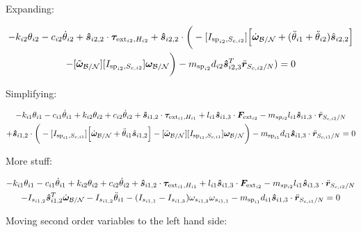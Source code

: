 \documentclass[paper]{aiaaNew}
\begin{document}
Expanding:

\begin{multline}
-k_{i2} \theta_{i2} - c_{i2} \dot{\theta}_{i2} + \bm{\hat{s}}_{i2,2} \cdot \bm \tau_{\text{ext}_{i2},H_{i2}} + \bm{\hat{s}}_{i2,2} \cdot \bigg(-[I_{\text{sp}_{i2},S_{c,i2}}] \Big[\dot{\bm \omega}_{\cal{B/N}} + (\ddot{\theta}_{i1}  + \ddot{\theta}_{i2})\hat{\bm s}_{i2,2}\Big]  \\
-[\tilde{\bm \omega}_{\cal{B/N}}] [I_{\text{sp}_{i2},S_{c,i2}}] \bm \omega_{\cal{B/N}} \bigg)
- m_{\text{sp}_{i2}} d_{i2}\bm{\hat{s}}_{i2,3}^T \ddot{\bm{r}}_{S_{c,i2}/N}) = 0
\end{multline}

Simplifying:

\begin{multline}
-k_{i1} \theta_{i1} - c_{i1} \dot{\theta}_{i1} + k_{i2} \theta_{i2} + c_{i2} \dot{\theta}_{i2} + \bm{\hat{s}}_{i1,2} \cdot \bm \tau_{\text{ext}_{i1},H_{i1}}  + l_{i1} \bm{\hat{s}}_{i1,3} \cdot \bm F_{\text{ext}_{i2}}  - m_{sp_{i2}} l_{i1} \bm{\hat{s}}_{i1,3} \cdot \ddot{\bm{r}}_{S_{c,i2}/N} \\
+ \bm{\hat{s}}_{i1,2} \cdot \bigg(-[I_{\text{sp}_{i1},S_{c,i1}}] \Big[\dot{\bm \omega}_{\cal{B/N}} + \ddot{\theta}_{i1} \hat{\bm s}_{i1,2}\Big]  
-[\tilde{\bm \omega}_{\cal{B/N}}] [I_{\text{sp}_{i1},S_{c,i1}}] \bm \omega_{\cal{B/N}} \bigg) -m_{\text{sp}_{i1}} d_{i1} \bm{\hat{s}}_{i1,3} \cdot \ddot{\bm{r}}_{S_{c,i1}/N} = 0
\end{multline}

More stuff:

\begin{multline}
-k_{i1} \theta_{i1} - c_{i1} \dot{\theta}_{i1} + k_{i2} \theta_{i2} + c_{i2} \dot{\theta}_{i2} + \bm{\hat{s}}_{i1,2} \cdot \bm \tau_{\text{ext}_{i1},H_{i1}}  + l_{i1} \bm{\hat{s}}_{i1,3} \cdot \bm F_{\text{ext}_{i2}}  - m_{sp_{i2}} l_{i1} \bm{\hat{s}}_{i1,3} \cdot \ddot{\bm{r}}_{S_{c,i2}/N} \\
- I_{s_{i1,2}} \bm{\hat{s}}_{i1,2}^T \dot{\bm \omega}_{\cal{B/N}} - I_{s_{i1,2}} \ddot{\theta}_{i1} - (I_{s_{i1,1}} - I_{s_{i1,3}}) \omega_{s_{i1,3}} \omega_{s_{i1,1}} -m_{\text{sp}_{i1}} d_{i1} \bm{\hat{s}}_{i1,3} \cdot \ddot{\bm{r}}_{S_{c,i1}/N} = 0
\end{multline}

Moving second order variables to the left hand side:
\end{document}
